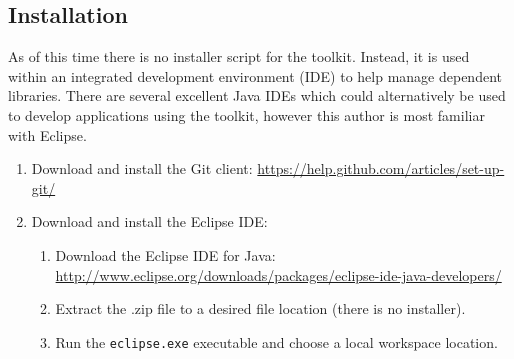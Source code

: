 \documentclass[]{article}
\begin{document}
\subsection{Installation}

As of this time there is no installer script for the toolkit. Instead, it is used within an integrated development environment (IDE) to help manage dependent libraries. There are several excellent Java IDEs which could alternatively be used to develop applications using the toolkit, however this author is most familiar with Eclipse.

\begin{enumerate}
\item Download and install the Git client: \url{https://help.github.com/articles/set-up-git/}
\item Download and install the Eclipse IDE:
\begin{enumerate}
\item Download the Eclipse IDE for Java: \\ \url{http://www.eclipse.org/downloads/packages/eclipse-ide-java-developers/}
\item Extract the .zip file to a desired file location (there is no installer).
\item Run the \texttt{eclipse.exe} executable and choose a local workspace location.
\end{enumerate}

\end{enumerate}
\end{document}
